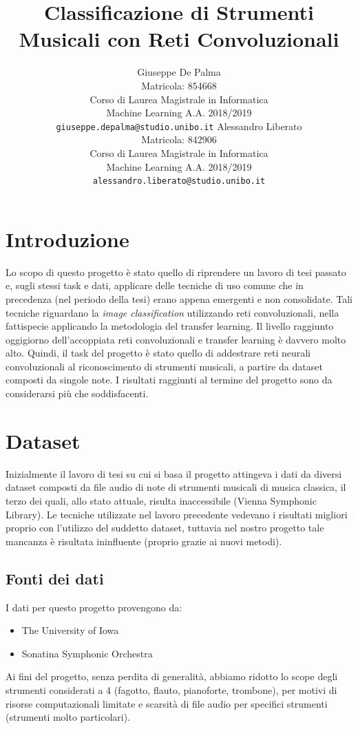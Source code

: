 \documentclass{article}
\title{Classificazione di Strumenti Musicali con Reti Convoluzionali}
\author{%
  Giuseppe De Palma \\
  Matricola: 854668 \\
  Corso di Laurea Magistrale in Informatica \\
  Machine Learning A.A. 2018/2019 \\
  \texttt{giuseppe.depalma@studio.unibo.it}
  \And
  Alessandro Liberato \\
  Matricola: 842906 \\
  Corso di Laurea Magistrale in Informatica \\
  Machine Learning A.A. 2018/2019 \\
  \texttt{alessandro.liberato@studio.unibo.it} 
}
\begin{document}

\maketitle
\section{Introduzione}
Lo scopo di questo progetto è stato quello di riprendere un lavoro di tesi passato e, sugli stessi task e dati,
applicare delle tecniche di uso comune che in precedenza (nel periodo della tesi) erano appena emergenti e non consolidate.
Tali tecniche riguardano la \textit{image classification} utilizzando reti convoluzionali, nella fattispecie applicando la metodologia del transfer learning.
Il livello raggiunto oggigiorno dell'accoppiata reti convoluzionali e transfer learning è davvero molto alto.
Quindi, il task del progetto è stato quello di addestrare reti neurali convoluzionali al riconoscimento di strumenti
musicali, a partire da dataset composti da singole note. I risultati raggiunti al termine del progetto sono da considerarsi
più che soddisfacenti.

\section{Dataset}

Inizialmente il lavoro di tesi su cui si basa il progetto attingeva i dati da diversi dataset composti da file audio di note di strumenti musicali 
di musica classica, il terzo dei quali, allo stato attuale,
risulta inaccessibile (Vienna Symphonic Library). Le tecniche utilizzate nel lavoro precedente vedevano i risultati migliori proprio
con l'utilizzo del suddetto dataset, tuttavia nel nostro progetto tale mancanza è risultata ininfluente (proprio grazie ai nuovi metodi).

\subsection{Fonti dei dati}
I dati per questo progetto provengono da:
\begin{itemize}
    \item The University of Iowa
    \item Sonatina Symphonic Orchestra
\end{itemize}
Ai fini del progetto, senza perdita di generalità, abbiamo ridotto lo scope degli strumenti considerati a 4 (fagotto, flauto, pianoforte, trombone), 
per motivi di risorse computazionali limitate e scarsità di file audio per specifici strumenti (strumenti molto particolari).
\end{document}

